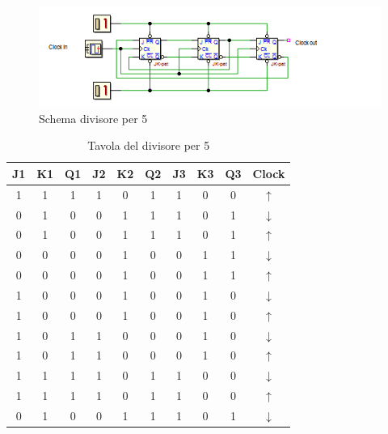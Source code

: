 \documentclass[journal, a4paper]{IEEEtran}
\begin{document}
\begin{figure}[htp]
\centering
\includegraphics[scale=.8]{hm4}
\caption{Schema divisore per 5}
\label{fig:div5}
\end{figure}

\begin{table}[htp]
\centering
\caption{Tavola del divisore per 5}
\label{tab:div5}
\begin{tabular}{c|c|c|c|c|c|c|c|c|c}

\textbf{J1} & \textbf{K1} & \textbf{Q1} & \textbf{J2} & \textbf{K2} & \textbf{Q2} & \textbf{J3 }& \textbf{K3} & \textbf{Q3} & Clock \\ 
\hline
1 & 1 & 1 & 1 & 0 & 1 & 1 & 0 & 0 & $\uparrow$ \\ 
 
0 & 1 & 0 & 0 & 1 & 1 & 1 & 0 & 1 & $\downarrow$ \\ 

0 & 1 & 0 & 0 & 1 & 1 & 1 & 0 & 1 & $\uparrow$ \\ 
 
0 & 0 & 0 & 0 & 1 & 0 & 0 & 1 & 1 & $\downarrow$ \\ 

0 & 0 & 0 & 0 & 1 & 0 & 0 & 1 & 1 & $\uparrow$ \\ 
 
1 & 0 & 0 & 0 & 1 & 0 & 0 & 1 & 0 & $\downarrow$ \\ 

1 & 0 & 0 & 0 & 1 & 0 & 0 & 1 & 0 & $\uparrow$ \\ 

1 & 0 & 1 & 1 & 0 & 0 & 0 & 1 & 0 & $\downarrow$ \\ 

1 & 0 & 1 & 1 & 0 & 0 & 0 & 1 & 0 & $\uparrow$ \\ 
 
1 & 1 & 1 & 1 & 0 & 1 & 1 & 0 & 0 & $\downarrow$ \\ 

1 & 1 & 1 & 1 & 0 & 1 & 1 & 0 & 0 & $\uparrow$ \\ 

0 & 1 & 0 & 0 & 1 & 1 & 1 & 0 & 1 & $\downarrow$ \\ 
\hline 
\end{tabular} 
\end{table}
~\\
\end{document}
